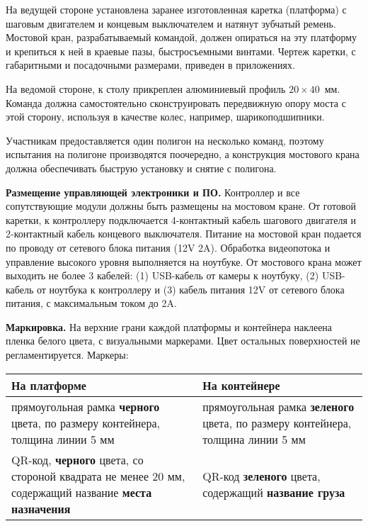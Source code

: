 На ведущей стороне установлена заранее изготовленная каретка (платформа) с шаговым двигателем и концевым выключателем и натянут зубчатый ремень. Мостовой кран, разрабатываемый командой, должен опираться на эту платформу и крепиться к ней в краевые пазы, быстросъемными винтами. Чертеж каретки, с габаритными и посадочными размерами, приведен в приложениях.

На ведомой стороне, к столу прикреплен алюминиевый профиль $20 \times 40$~мм. Команда должна самостоятельно сконструировать передвижную опору моста с этой сторону, используя в качестве колес, например, шарикоподшипники.

Участникам предоставляется один полигон на несколько команд, поэтому испытания на полигоне производятся поочередно, а конструкция мостового крана должна обеспечивать быструю установку и снятие с полигона.

\textbf{Размещение управляющей электроники и ПО.} Контроллер и все сопутствующие модули должны быть размещены на мостовом кране. От готовой каретки, к контроллеру подключается 4-контактный кабель шагового двигателя и 2-контактный кабель концевого выключателя.  Питание на мостовой кран подается по проводу от сетевого блока питания (12V 2A).  Обработка видеопотока и управление высокого уровня выполняется на ноутбуке.  От мостового крана может выходить не более 3 кабелей:  (1) USB-кабель от камеры к ноутбуку, (2) USB-кабель от ноутбука к контроллеру и (3) кабель питания 12V от сетевого блока питания, с максимальным током до 2A.  

\textbf{Маркировка.} На верхние грани каждой платформы и контейнера наклеена пленка белого цвета, с визуальными маркерами.  Цвет остальных поверхностей не регламентируется.  Маркеры:

\begin{center}
    \begin{tabular}{|p{7cm}|p{7cm}|}
        \hline
        \textbf{На платформе}&	\textbf{На контейнере}\\
        \hline
        прямоугольная рамка \textbf{черного} цвета, по размеру контейнера, толщина линии 5 мм & прямоугольная рамка \textbf{зеленого} цвета, по размеру контейнера, толщина линии 5 мм \\
        \hline
        QR-код, \textbf{черного} цвета, со стороной квадрата не менее 20 мм, содержащий название \textbf{места назначения} & QR-код \textbf{зеленого} цвета, содержащий \textbf{название груза} \\
        \hline
    \end{tabular}
\end{center}

